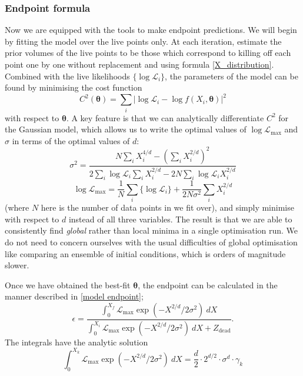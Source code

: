 \documentclass[usenatbib]{mnras} %
\newcommand{\logL}{\{ \log \Like_i \}} %
\newcommand{\thetab}{\bm{\theta}}
\newcommand{\logLm}{\log \Like_\mathrm{max}}
\newcommand{\Like}{\mathcal{L}}
\begin{document}
\subsubsection{Endpoint formula}
Now we are equipped with the tools to make endpoint predictions. We will begin by fitting the model over the live points only. At each iteration, estimate the prior volumes of the live points to be those which correspond to killing off each point one by one without replacement and using formula \eqref{X_distribution}. Combined with the live likelihoods $\logL$, the parameters of the model can be found by minimising the cost function
\begin{equation}\label{chi squared}
	C^2(\thetab) = \sum_i \left| \log \Like_i - \log f(X_i, \thetab) \right| ^2
\end{equation}
with respect to $\thetab$. A key feature is that we can analytically differentiate  $C^2$ for the Gaussian model, which allows us to write the optimal values of $\logLm$ and $\sigma$ in terms of the optimal values of $d$:
\begin{equation}
    \sigma^2 = \frac{N \sum_i X_i^{4/d} - \left(\sum_i X_i^{2/d}\right)^2}{2 \sum_i \log \Like_i \sum_i X_i^{2/d} - 2N \sum_i \log \Like_i X_i^{2/d}}
\end{equation}
\begin{equation}
    \logLm = \frac{1}{N} \sum_i \logL + \frac{1}{2N\sigma^2} \sum_i X_i^{2/d} 
\end{equation}
(where $N$ here is the number of data points in we fit over), and simply minimise with respect to $d$ instead of all three variables. The result is that we are able to consistently find \textit{global} rather than local minima in a single optimisation run. We do not need to concern ourselves with the usual difficulties of global optimisation like comparing an ensemble of initial conditions, which is orders of magnitude slower.
\par
Once we have obtained the best-fit $\thetab$, the endpoint can be calculated in the manner described in \eqref{model endpoint};
\begin{equation}
	\epsilon = \frac{\int_0^{X_f} \Like_\mathrm{max} \exp\left(-X^{2/d}/2\sigma^2\right)\ dX}{\int_0^{X_i} \Like_\mathrm{max} \exp\left(-X^{2/d}/2\sigma^2\right)\ dX + Z_\mathrm{dead}}.
\end{equation}
The integrals have the analytic solution
\begin{equation}
	\int_0^{X_k} \Like_\mathrm{max} \exp\left(-X^{2/d}/2\sigma^2\right)\ dX = \frac{d}{2} \cdot 2^{d/2} \cdot \sigma^{d} \cdot \gamma_k
\end{equation}
\end{document}

